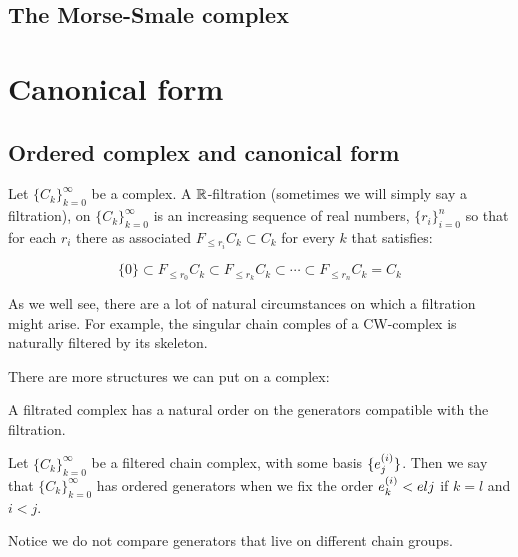 \section{The Morse-Smale complex}





\chapter{Canonical form}



\section{Ordered complex and canonical form}


\begin{definition}
Let $\{C_k\}_{k=0}^{\infty}$ be a complex. 
A $\mathbb{R}$-filtration (sometimes we will simply say a filtration), on $\{C_k\}_{k=0}^{\infty}$ 
is an increasing sequence of real numbers, $\{r_i\}_{i=0}^n$
so that for each $r_i$ there as associated $F_{\leq r_i}C_k\subset C_k$ for every $k$
that satisfies:

$$
\{0\}\subset
F_{\leq r_0}C_k
\subset
F_{\leq r_k}C_k
\subset
\cdots
\subset
F_{\leq r_n}C_k
=
C_k
$$
\end{definition}

As we well see, there are a lot of natural circumstances on which a filtration might arise. For example, 
the singular chain comples of a CW-complex is naturally filtered by its skeleton.

There are more structures we can put on a complex:


\begin{remark}
A filtrated complex has a natural order on the generators compatible with the filtration.
\end{remark}

\begin{definition}

Let $\{C_k\}_{k=0}^{\infty}$ be a filtered chain complex, with some basis $\{e_{j}^{(i)}\}$.
Then we say that $\{C_k\}_{k=0}^{\infty}$ has ordered generators when we fix the order 
$e_{k}^{(i)}<e{l}{j}$ if  $k=l$ and $i<j$.

Notice we do not compare generators that live on different chain groups.
\end{definition}




